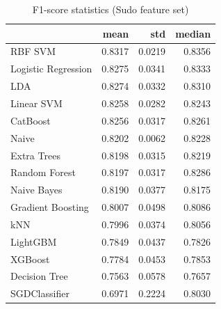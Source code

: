 \begin{table}
\caption{F1-score statistics (Sudo feature set)}
\label{tab:f1_Sudo_stats}
\begin{tabular}{lrrr}
\toprule
 & mean & std & median \\
\midrule
RBF SVM & 0.8317 & 0.0219 & 0.8356 \\
Logistic Regression & 0.8275 & 0.0341 & 0.8333 \\
LDA & 0.8274 & 0.0332 & 0.8310 \\
Linear SVM & 0.8258 & 0.0282 & 0.8243 \\
CatBoost & 0.8256 & 0.0317 & 0.8261 \\
Naive & 0.8202 & 0.0062 & 0.8228 \\
Extra Trees & 0.8198 & 0.0315 & 0.8219 \\
Random Forest & 0.8197 & 0.0317 & 0.8286 \\
Naive Bayes & 0.8190 & 0.0377 & 0.8175 \\
Gradient Boosting & 0.8007 & 0.0498 & 0.8086 \\
kNN & 0.7996 & 0.0374 & 0.8056 \\
LightGBM & 0.7849 & 0.0437 & 0.7826 \\
XGBoost & 0.7784 & 0.0453 & 0.7853 \\
Decision Tree & 0.7563 & 0.0578 & 0.7657 \\
SGDClassifier & 0.6971 & 0.2224 & 0.8030 \\
\bottomrule
\end{tabular}
\end{table}
